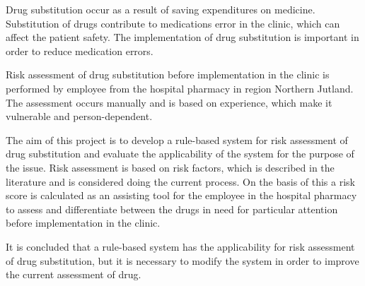\vspace{-0.3cm}
Drug substitution occur as a result of saving expenditures on medicine. Substitution of drugs contribute to medications error in the clinic, which can affect the patient safety. The implementation of drug substitution is important in order to reduce medication errors. 

Risk assessment of drug substitution before implementation in the clinic is performed by employee from the hospital pharmacy in region Northern Jutland. The assessment occurs manually and is based on experience, which make it vulnerable and person-dependent.

The aim of this project is to develop a rule-based system for risk assessment of drug substitution and evaluate the applicability of the system for the purpose of the issue. Risk assessment is based on risk factors, which is described in the literature and is considered doing the current process. On the basis of this a risk score is calculated as an assisting tool for the employee in the hospital pharmacy to assess and differentiate between the drugs in need for particular attention before implementation in the clinic. 

It is concluded that a rule-based system has the applicability for risk assessment of drug substitution, but it is necessary to modify the system in order to improve the current assessment of drug.
\vspace{-0.2cm}